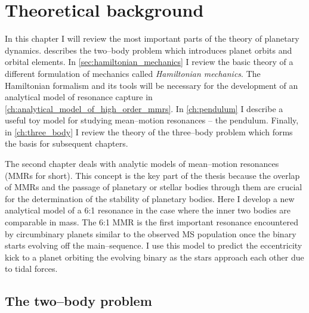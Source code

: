 \chapter{Theoretical background}
\label{ch:theoretical_bakcground}
In this chapter I will review the most important parts of the theory
of planetary dynamics.  describes the two--body problem which 
introduces planet orbits and orbital elements. In \cref{sec:hamiltonian_mechanics}
I review the basic theory of a different formulation of mechanics called
\emph{Hamiltonian mechanics}. The Hamiltonian formalism and its tools will
be necessary for the development of an analytical model of resonance
capture in \cref{ch:analytical_model_of_high_order_mmrs}. In \cref{ch:pendulum}
I describe a useful toy model for studying mean--motion resonances -- the pendulum.
Finally, in \cref{ch:three_body} I review the theory of the three--body problem 
which forms the basis for subsequent chapters.

The second chapter deals with analytic models of mean--motion resonances
(MMRs for short). This concept is the key part of the thesis because the overlap
of MMRs and the passage of planetary or stellar bodies through them 
are crucial for the determination of the stability of planetary bodies. 
Here I develop a new analytical model of a 6:1 resonance in the case 
where the inner two bodies are 
comparable in mass. The 6:1 MMR is the first important resonance encountered
by circumbinary planets similar to the observed MS population once the 
binary starts evolving off the main--sequence. I use this 
model to predict the eccentricity kick to a planet orbiting the evolving
binary as the stars approach each other due to tidal forces. 

\section{The two--body problem}
\label{sec:two_body}
